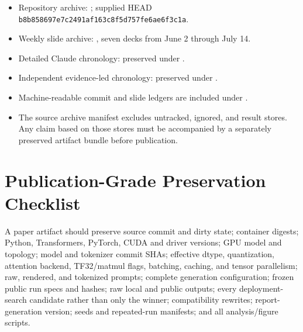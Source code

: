 \documentclass[11pt]{report}
\newcommand{\code}[1]{\texttt{#1}}
\begin{document}
\begin{itemize}
  \item Repository archive: ; supplied HEAD \code{b8b858697e7c2491af163c8f5d757fe6ae6f3c1a}.
  \item Weekly slide archive: , seven decks from June 2 through July 14.
  \item Detailed Claude chronology: preserved under .
  \item Independent evidence-led chronology: preserved under .
  \item Machine-readable commit and slide ledgers are included under .
  \item The source archive manifest excludes untracked, ignored, and 
        result stores. Any claim based on those stores must be accompanied by a
        separately preserved artifact bundle before publication.
\end{itemize}

\chapter{Publication-Grade Preservation Checklist}

A paper artifact should preserve source commit and dirty state; container digests;
Python, Transformers, PyTorch, CUDA and driver versions; GPU model and topology;
model and tokenizer commit SHAs; effective dtype, quantization, attention backend,
TF32/matmul flags, batching, caching, and tensor parallelism; raw, rendered, and
tokenized prompts; complete generation configuration; frozen public run specs and
hashes; raw local and public outputs; every deployment-search candidate rather than
only the winner; compatibility rewrites; report-generation version; seeds and
repeated-run manifests; and all analysis/figure scripts.

\end{document}
